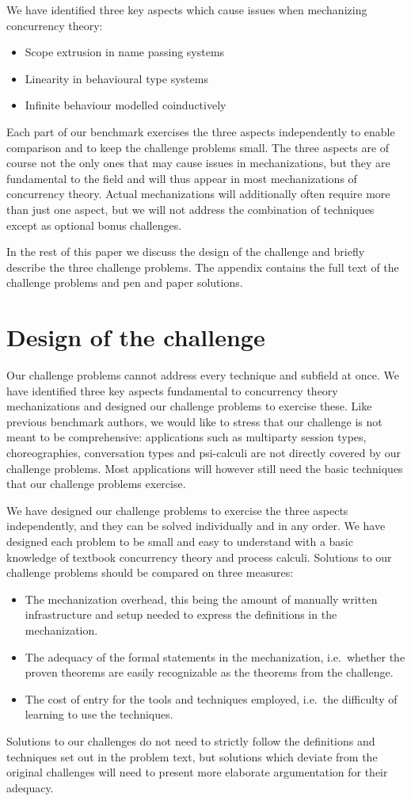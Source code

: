 \documentclass[adraft,copyright,creativecommons]{eptcs}
\begin{document}
We have identified three key aspects which cause issues when mechanizing concurrency theory:
\begin{itemize}
\item Scope extrusion in name passing systems
\item Linearity in behavioural type systems
\item Infinite behaviour modelled coinductively
\end{itemize}
Each part of our benchmark exercises the three aspects independently to enable comparison and to keep the challenge problems small.
The three aspects are of course not the only ones that may cause issues in mechanizations, but they are fundamental to the field and will thus appear in most mechanizations of concurrency theory.
Actual mechanizations will additionally often require more than just one aspect, but we will not address the combination of techniques except as optional bonus challenges.

In the rest of this paper we discuss the design of the challenge and briefly describe the three challenge problems.
The appendix contains the full text of the challenge problems and pen and paper solutions.

\section{Design of the challenge}
Our challenge problems cannot address every technique and subfield at once.
We have identified three key aspects fundamental to concurrency theory mechanizations and designed our challenge problems to exercise these.
Like previous benchmark authors, we would like to stress that our challenge is not meant to be comprehensive: applications such as multiparty session types, choreographies, conversation types and psi-calculi are not directly covered by our challenge problems.
Most applications will however still need the basic techniques that our challenge problems exercise.

We have designed our challenge problems to exercise the three aspects independently, and they can be solved individually and in any order.
We have designed each problem to be small and easy to understand with a basic knowledge of textbook concurrency theory and process calculi.
Solutions to our challenge problems should be compared on three measures:
\begin{itemize}
\item The mechanization overhead, this being the amount of manually written infrastructure and setup needed to express the definitions in the mechanization.
\item The adequacy of the formal statements in the mechanization, i.e.\ whether the proven theorems are easily recognizable as the theorems from the challenge.
\item The cost of entry for the tools and techniques employed, i.e.\ the difficulty of learning to use the techniques.
\end{itemize}
Solutions to our challenges do not need to strictly follow the definitions and techniques set out in the problem text, but solutions which deviate from the original challenges will need to present more elaborate argumentation for their adequacy.
\end{document}
